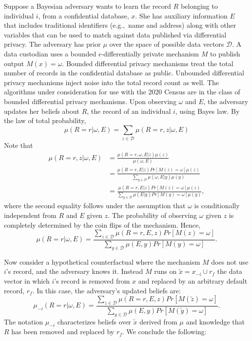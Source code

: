

Suppose a Bayesian adversary wants to learn the record $R$ belonging to individual $i$, from a confidential database, $x$. She has auxiliary information $E$ that includes traditional identifiers (e.g.,\ name and address) along with other variables that can be used to match against data published via differential privacy.
The adversary has prior $\mu$ over the space of possible data vectors $\mathcal{D}$. A data custodian uses a bounded $\epsilon$-differentially private mechanism $M$ to publish output $M(x)=\omega$. Bounded differential privacy mechanisms treat the total number of records in the confidential database as public. Unbounded differential privacy mechanisms inject noise into the total record count as well. The algorithms under consideration for use with the 2020 Census are in the class of bounded differential privacy mechanisms. Upon observing $\omega$ and $E$, the adversary updates her beliefs about $R$, the record of an individual $i$, using Bayes law. By the law of total probability,
$$\mu(R=r | \omega, E) = \sum_{z \in \mathcal{D}} \mu(R=r, z | \omega, E)$$
Note that
\begin{align*}
\mu(R=r, z | \omega, E) &= \frac{\mu(R=r, \omega, E | z)\mu(z)}{\mu(\omega, E)}\\ 
&= \frac{\mu(R=r, E | z) Pr[M(z)=\omega] \mu(z)}{\sum_{y \in \mathcal{D}}\mu(\omega, E | y)\mu(y)} \\
&=\frac{\mu(R=r, E | z) Pr[M(z)=\omega] \mu(z)}{\sum_{y \in \mathcal{D}}\mu(E | y)Pr[M(y)=\omega]\mu(y)},
\end{align*}
where the second equality follows under the assumption that $\omega$ is conditionally independent from $R$ and $E$ given $z$. The probability of observing $\omega$ given $z$ is completely determined by the coin flips of the mechanism.  
Hence,
$$\mu(R=r | \omega, E) = \frac{\sum_{z \in \mathcal{D}}\mu(R=r, E, z) Pr[M(z)=\omega]}{\sum_{y \in \mathcal{D}}\mu(E, y)Pr[M(y)=\omega]}.$$

Now consider a hypothetical counterfactual where the mechanism $M$ does not use $i$'s record, and the adversary knows it. Instead $M$ runs on $\tilde{x} = x_{-i}\cup r_{f}$ the data vector in which $i$'s record is removed from $x$ and replaced by an arbitrary default record, $r_{f}$. In this case, the adversary's updated beliefs are:
$$\mu_{-i}(R=r | \omega, E) = \frac{\sum_{z \in \mathcal{D}}\mu(R=r, E, z) Pr[M(\tilde{z})=\omega]}{\sum_{y \in \mathcal{D}}\mu(E, y)Pr[M(\tilde{y})=\omega]}.$$ The notation $\mu_{-i}$ characterizes beliefs over $\tilde{x}$ derived from $\mu$ and knowledge that $R$ has been removed and replaced by $r_{f}$.
We conclude the following:

